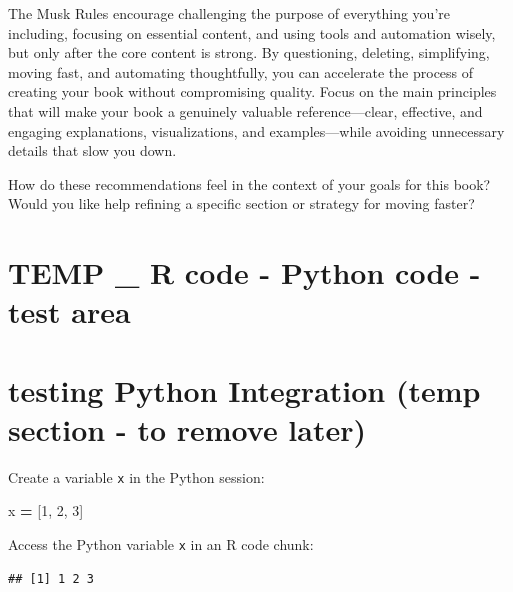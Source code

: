 \documentclass[
  12 pt,
  a4paper,
]{book}
\newenvironment{Shaded}{\begin{snugshade}}{\end{snugshade}}
\newcommand{\DecValTok}[1]{\textcolor[rgb]{0.00,0.00,0.81}{#1}}
\newcommand{\NormalTok}[1]{#1}
\newcommand{\OperatorTok}[1]{\textcolor[rgb]{0.81,0.36,0.00}{\textbf{#1}}}
\newcommand{\SpecialCharTok}[1]{\textcolor[rgb]{0.81,0.36,0.00}{\textbf{#1}}}
\numberwithin{equation}{section}
\theoremstyle{plain}      %
\theoremstyle{definition} %
\theoremstyle{remark}     %
\theoremstyle{note}         %
\begin{document}
The Musk Rules encourage challenging the purpose of everything you're
including, focusing on essential content, and using tools and automation
wisely, but only after the core content is strong. By questioning,
deleting, simplifying, moving fast, and automating thoughtfully, you can
accelerate the process of creating your book without compromising
quality. Focus on the main principles that will make your book a
genuinely valuable reference---clear, effective, and engaging
explanations, visualizations, and examples---while avoiding unnecessary
details that slow you down.

How do these recommendations feel in the context of your goals for this
book? Would you like help refining a specific section or strategy for
moving faster?

\newpage

\hypertarget{temp-_-r-code---python-code---test-area}{%
\section{TEMP \_ R code - Python code - test
area}\label{temp-_-r-code---python-code---test-area}}

\hypertarget{testing-python-integration-temp-section---to-remove-later}{%
\section{testing Python Integration (temp section - to remove
later)}\label{testing-python-integration-temp-section---to-remove-later}}

Create a variable \texttt{x} in the Python session:

\begin{Shaded}
\begin{Highlighting}[]
\NormalTok{x }\OperatorTok{=}\NormalTok{ [}\DecValTok{1}\NormalTok{, }\DecValTok{2}\NormalTok{, }\DecValTok{3}\NormalTok{]}
\end{Highlighting}
\end{Shaded}

Access the Python variable \texttt{x} in an R code chunk:

\begin{Shaded}
\end{Shaded}

\begin{verbatim}
## [1] 1 2 3
\end{verbatim}
\end{document}
